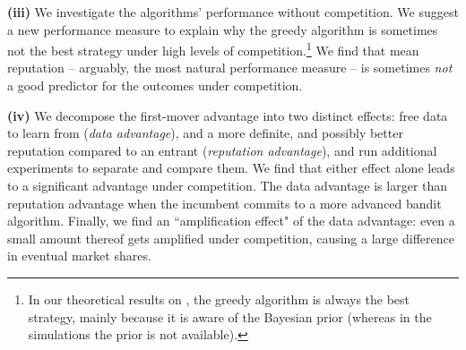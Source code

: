 
\textbf{(iii)} We investigate the algorithms' performance without competition. We suggest a new performance measure to explain why the greedy algorithm is sometimes not the best strategy under high levels of competition.\footnote{In our theoretical results on \HardMax, the greedy algorithm is always the best strategy, mainly because it is aware of the Bayesian prior (whereas in the simulations  the prior is not available).}
     We find that mean reputation -- arguably, the most natural performance measure -- is sometimes \emph{not} a good predictor for the outcomes under competition.

\textbf{(iv)} We decompose the first-mover advantage into two distinct effects: free data to learn from (\emph{data advantage}), and a more definite, and possibly better reputation compared to an entrant (\emph{reputation advantage}), and run additional experiments to separate and compare them. We find that either effect alone leads to a significant advantage under competition. The data advantage is larger than reputation advantage when the incumbent commits to a more advanced bandit algorithm. Finally, we find an ``amplification effect" of the data advantage: even a small amount thereof gets amplified under competition, causing a large difference in eventual market shares.


